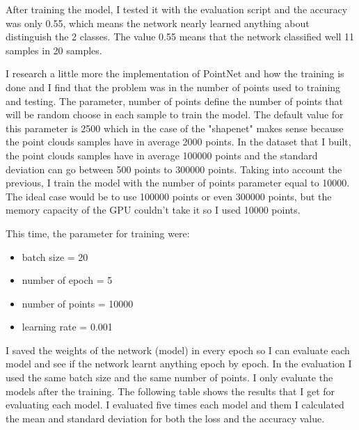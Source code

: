     After training the model, I tested it with the evaluation script and the accuracy was only 0.55, which means the network nearly learned anything about distinguish the 2 classes. The value 0.55 means that the network classified well 11 samples in 20 samples.
    
    \bigskip
    
    I research a little more the implementation of PointNet and how the training is done and I find that the problem was in the number of points used to training and testing. The parameter, number of points define the number of points that will be random choose in each sample to train the model. The default value for this parameter is 2500 which in the case of the "shapenet" makes sense because the point clouds samples have in average 2000 points. In the dataset that I built, the point clouds samples have in average 100000 points and the standard deviation can go between 500 points to 300000 points. Taking into account the previous, I train the model with the number of points parameter equal to 10000. The ideal case would be to use 100000 points or even 300000 points, but the memory capacity of the GPU couldn't take it so I used 10000 points.
    
    This time, the parameter for training were:
    
    \begin{itemize}
    \item batch size = 20
    \item number of epoch = 5
    \item number of points = 10000
    \item learning rate = 0.001
    \end{itemize}
    
    I saved the weights of the network (model) in every epoch so I can evaluate each model and see if the network learnt anything epoch by epoch. In the evaluation I used the same batch size and the same number of points. I only evaluate the models after the training. The following table shows the results that I get for evaluating each model. I evaluated five times each model and them I calculated the mean and standard deviation for both the loss and the accuracy value.
    
\bigskip    
    
